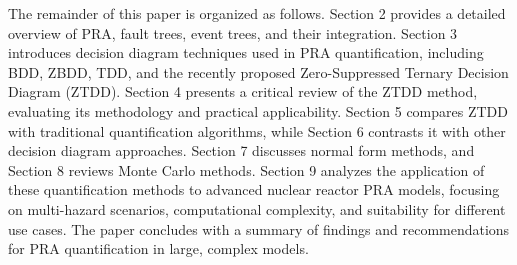 The remainder of this paper is organized as follows. Section 2 provides a detailed overview of PRA, fault trees, event trees, and their integration. Section 3 introduces decision diagram techniques used in PRA quantification, including BDD, ZBDD, TDD, and the recently proposed Zero-Suppressed Ternary Decision Diagram (ZTDD). Section 4 presents a critical review of the ZTDD method, evaluating its methodology and practical applicability. Section 5 compares ZTDD with traditional quantification algorithms, while Section 6 contrasts it with other decision diagram approaches. Section 7 discusses normal form methods, and Section 8 reviews Monte Carlo methods. Section 9 analyzes the application of these quantification methods to advanced nuclear reactor PRA models, focusing on multi-hazard scenarios, computational complexity, and suitability for different use cases. The paper concludes with a summary of findings and recommendations for PRA quantification in large, complex models.

